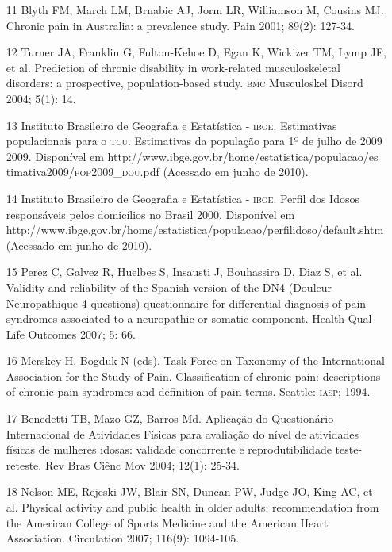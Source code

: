 \documentclass{article}
\begin{document}
\begin{itemize}
\item[11] Blyth FM, March LM, Brnabic AJ, Jorm LR, Williamson M, Cousins MJ.
Chronic pain in Australia: a prevalence study. Pain 2001; 89(2): 127-34.

\item[12] Turner JA, Franklin G, Fulton-Kehoe D, Egan K, Wickizer TM, Lymp
JF, et al. Prediction of chronic disability in work-related musculoskeletal
disorders: a prospective, population-based study. \textsc{bmc} Musculoskel Disord 2004;
5(1): 14.

\item[13] Instituto Brasileiro de Geografia e Estatística - \textsc{ibge}.
Estimativas populacionais para o \textsc{tcu}. Estimativas da população para 1º de julho
de 2009 2009. Disponível em http://www.ibge.gov.br/home/estatistica/populacao/es
timativa2009/\textsc{pop}2009\_{}\textsc{dou}.pdf (Acessado em junho de 2010).

\item[14] Instituto Brasileiro de Geografia e Estatística - \textsc{ibge}. Perfil dos
Idosos responsáveis pelos domicílios no Brasil 2000. Disponível em
http://www.ibge.gov.br/home/estatistica/populacao/perfilidoso/default.shtm
(Acessado em junho de 2010).

\item[15] Perez C, Galvez R, Huelbes S, Insausti J, Bouhassira D, Diaz S, et
al. Validity and reliability of the Spanish version of the DN4 (Douleur
Neuropathique 4 questions) questionnaire for differential diagnosis of pain
syndromes associated to a neuropathic or somatic component. Health Qual Life
Outcomes 2007; 5: 66.

\item[16] Merskey H, Bogduk N (eds). Task Force on Taxonomy of the
International Association for the Study of Pain. Classification of chronic pain:
descriptions of chronic pain syndromes and definition of pain terms. Seattle:
\textsc{iasp}; 1994.

\item[17] Benedetti TB, Mazo GZ, Barros Md. Aplicação do Questionário
Internacional de Atividades Físicas para avaliação do nível de atividades
físicas de mulheres idosas: validade concorrente e reprodutibilidade
teste-reteste. Rev Bras Ciênc Mov 2004; 12(1): 25-34.

\item[18] Nelson ME, Rejeski JW, Blair SN, Duncan PW, Judge JO, King AC, et
al. Physical activity and public health in older adults: recommendation from the
American College of Sports Medicine and the American Heart Association.
Circulation 2007; 116(9): 1094-105.


\end{itemize}
\end{document}
